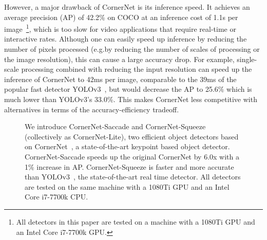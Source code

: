 \documentclass{bmvc2k}
\begin{document}
However, a major drawback of CornerNet is its inference speed. It achieves an average precision (AP) of 42.2\% on COCO at an inference cost of 1.1s per image~\footnote{All detectors in this paper are tested on a machine with a 1080Ti GPU and an Intel Core i7-7700k GPU.}, which is too slow for video applications that require real-time or interactive rates. 
Although one can easily speed up inference by reducing the number of pixels processed (e.g.\@ by reducing the number of scales of processing or the image resolution), this can cause a large accuracy drop. For example, single-scale processing combined with reducing the input resolution can speed up the inference of CornerNet to 42ms per image, comparable to the 39ms of the popular fast detector YOLOv3~\cite{redmon2018yolov3}, but would decrease the AP to 25.6\% which is much lower than YOLOv3's 33.0\%. This makes CornerNet less competitive with alternatives in terms of the accuracy-efficiency tradeoff. 

\begin{figure}
    \centering
    \caption{We introduce CornerNet-Saccade and CornerNet-Squeeze (collectively as CornerNet-Lite), two efficient object detectors based on CornerNet~\cite{law2018cornernet}, a state-of-the-art keypoint based object detector. CornerNet-Saccade speeds up the original CornerNet by 6.0x with a 1\% increase in AP. CornerNet-Squeeze is faster and more accurate than YOLOv3~\cite{redmon2018yolov3}, the state-of-the-art real time detector. All detectors are tested on the same machine with a 1080Ti GPU and an Intel Core i7-7700k CPU.}
    \label{fig:test}
\end{figure}
\end{document}
